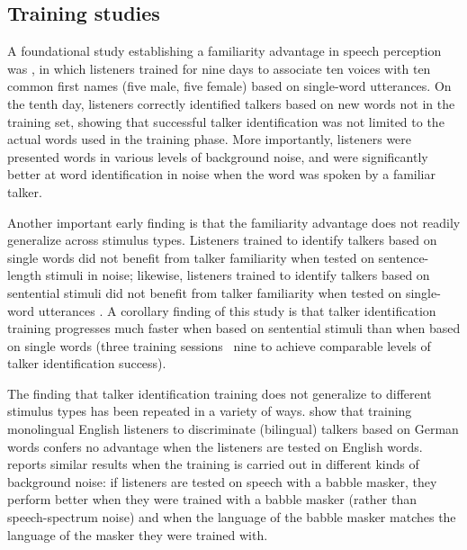\subsection{Training studies\label{sec:Training}}
A foundational study establishing a familiarity advantage in speech perception was \citet{NygaardEtAl1994}, in which listeners trained for nine days to associate ten voices with ten common first names (five male, five female) based on single-word utterances.  On the tenth day, listeners correctly identified talkers based on new words not in the training set, showing that successful talker identification was not limited to the actual words used in the training phase.  More importantly, listeners were presented words in various levels of background noise, and were significantly better at word identification in noise when the word was spoken by a familiar talker.

Another important early finding is that the familiarity advantage does not readily generalize across stimulus types.  Listeners trained to identify talkers based on single words did not benefit from talker familiarity when tested on sentence-length stimuli in noise; likewise, listeners trained to identify talkers based on sentential stimuli did not benefit from talker familiarity when tested on single-word utterances \citep{NygaardPisoni1998, YonanSommers2000}.  A corollary finding of this study is that talker identification training progresses much faster when based on sentential stimuli than when based on single words (three training sessions \vs\ nine to achieve comparable levels of talker identification success).     

The finding that talker identification training does not generalize to different stimulus types has been repeated in a variety of ways.  \citet{LeviEtAl2011} show that training monolingual English listeners to discriminate (bilingual) talkers based on German words confers no advantage when the listeners are tested on English words.\footnotemark{}  \citet{VanEngen2012} reports similar results when the training is carried out in different kinds of background noise: if listeners are tested on speech with a babble masker, they perform better when they were trained with a babble masker (rather than speech-spectrum noise) and when the language of the babble masker matches the language of the masker they were trained with.


